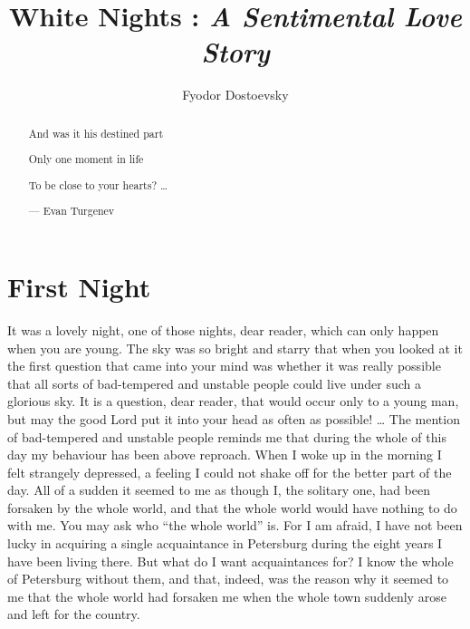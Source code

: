 \documentclass[a4paper,10pt]{article}
\title{White Nights : \textit{A Sentimental Love Story}}
\author{Fyodor Dostoevsky}
\begin{document}
\maketitle

\begin{abstract}

    And was it his destined part

    Only one moment in life

    To be close to your hearts? \dots

    --- Evan Turgenev

\end{abstract}

\section{First Night}

It was a lovely night, one of those nights, dear reader, which can only happen when you are young.
The sky was so bright and starry that when you looked at it the first question that came into your mind was whether it was really possible that all sorts of bad-tempered and unstable people could live under such a glorious sky.
It is a question, dear reader, that would occur only to a young man, but may the good Lord put it  into your head as often as possible! \dots
The mention of bad-tempered and unstable people reminds me that during the whole of this day my behaviour has been above reproach.
When I woke up in the morning I felt strangely depressed, a feeling I could not shake off for the better part of the day.
All of a sudden it seemed to me as though I, the solitary one, had been forsaken by the whole world, and that the whole world would have nothing to do with me.
You may ask who ``the whole world'' is.
For I am afraid, I have not been lucky in acquiring a single acquaintance in Petersburg during the eight years I have been living there.
But what do I want acquaintances for?
I know the whole of Petersburg without them, and that, indeed, was the reason why it seemed to me that the whole world had forsaken me when the whole town suddenly arose and left for the country.
\end{document}
